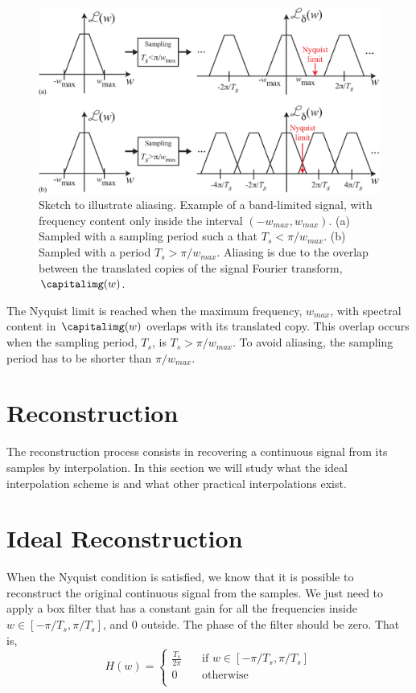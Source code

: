 \begin{figure}[t]
\centerline{
\includegraphics[width=1\linewidth]{figures/Image_processing_sampling/sketch_aliasing.eps}
}
\caption{Sketch to illustrate aliasing. Example of a band-limited signal, with frequency content only inside the interval $(-w_{max}, w_{max})$. (a) Sampled with a sampling period such a that $T_s < \pi/w_{max}$. (b) Sampled with a period $T_s > \pi/w_{max}$. Aliasing is due to the overlap between the translated copies of the signal Fourier transform, $\capitalimg(w)$.} 
\label{fig:sketch_aliasing}
\end{figure}

The Nyquist limit 
is reached when the maximum frequency, $w_{max}$, with spectral content in $\capitalimg (w)$ overlaps with its translated copy. This overlap occurs when the sampling period, $T_s$, is $T_s > \pi/w_{max}$. To avoid aliasing, the sampling period has to be shorter than $\pi/w_{max}$. 



\section{Reconstruction}

The reconstruction process consists in recovering a continuous signal from its samples by interpolation. In this section we will study what the ideal interpolation scheme is and what other practical interpolations exist. 

\section{Ideal Reconstruction}
\label{sec:aliasing:ideal_reconstruction}

When the Nyquist condition is satisfied, we know that it is possible to reconstruct the original continuous signal from the samples. We just need to apply a box filter that has a constant gain for all the frequencies inside $w \in \left[-\pi / T_s, \pi / T_s \right]$, and 0 outside. The phase of the filter should be zero. That is,
\begin{equation}
H(w) = 
 \begin{cases}
    \frac{T_s}{2\pi}       & \quad \text{if } w \in \left[-\pi / T_s, \pi / T_s \right]\\
    0       & \quad \text{otherwise }\\
  \end{cases}
\label{eq:boxfilterFT}
\end{equation}  


